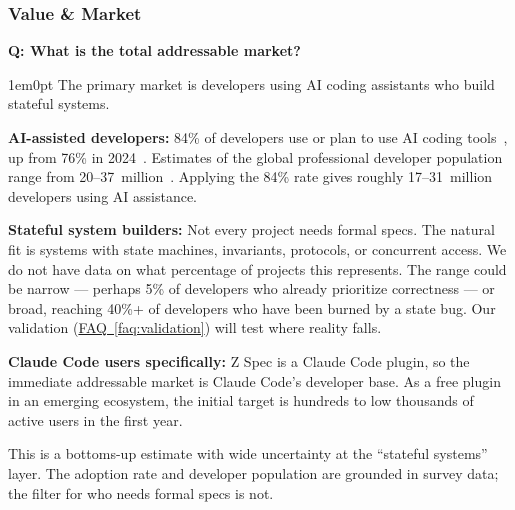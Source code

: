 \documentclass[11pt,letterpaper]{article}
\newcounter{faqnum}
\newenvironment{faqpair}[1]{%
  \needspace{4\baselineskip}%
  \vspace{0.5em}%
  \refstepcounter{faqnum}%
  \noindent\textbf{\color{SectionBlue}Q\thefaqnum: #1}\par\nopagebreak[4]%
  \vspace{0.2em}%
  \begin{adjustwidth}{1em}{0pt}%
  \setlength{\parindent}{0pt}%
}{%
  \end{adjustwidth}%
  \vspace{0.5em}%
}
\newcommand{\faqref}[1]{\hyperref[#1]{FAQ~\ref*{#1}}}
\begin{document}
\subsubsection*{Value \& Market}

\begin{faqpair}{What is the total addressable market?}\label{faq:tam}
The primary market is developers using AI coding assistants who build stateful systems.

\textbf{AI-assisted developers:} 84\% of developers use or plan to use AI coding tools~\cite{stackoverflow2025survey}, up from 76\% in 2024~\cite{stackoverflow2024survey}. Estimates of the global professional developer population range from 20--37~million~\cite{slashdata2025devpop}. Applying the 84\% rate gives roughly 17--31~million developers using AI assistance.

\textbf{Stateful system builders:} Not every project needs formal specs. The natural fit is systems with state machines, invariants, protocols, or concurrent access. We do not have data on what percentage of projects this represents. The range could be narrow --- perhaps 5\% of developers who already prioritize correctness --- or broad, reaching 40\%+ of developers who have been burned by a state bug. Our validation (\faqref{faq:validation}) will test where reality falls.

\textbf{Claude Code users specifically:} Z Spec is a Claude Code plugin, so the immediate addressable market is Claude Code's developer base. As a free plugin in an emerging ecosystem, the initial target is hundreds to low thousands of active users in the first year.

This is a bottoms-up estimate with wide uncertainty at the ``stateful systems'' layer. The adoption rate and developer population are grounded in survey data; the filter for who needs formal specs is not.
\end{faqpair}
\end{document}
